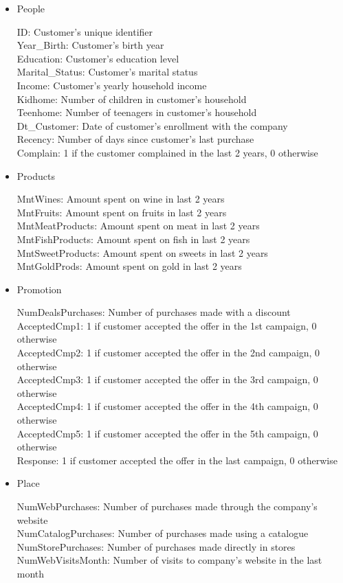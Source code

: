 \documentclass[11pt]{article}
\begin{document}
\begin{itemize}
\item People

ID: Customer's unique identifier\\
Year\_Birth: Customer's birth year\\
Education: Customer's education level\\
Marital\_Status: Customer's marital status\\
Income: Customer's yearly household income\\
Kidhome: Number of children in customer's household\\
Teenhome: Number of teenagers in customer's household\\
Dt\_Customer: Date of customer's enrollment with the company\\
Recency: Number of days since customer's last purchase\\
Complain: 1 if the customer complained in the last 2 years, 0 otherwise

\item Products

MntWines: Amount spent on wine in last 2 years\\
MntFruits: Amount spent on fruits in last 2 years\\
MntMeatProducts: Amount spent on meat in last 2 years\\
MntFishProducts: Amount spent on fish in last 2 years\\
MntSweetProducts: Amount spent on sweets in last 2 years\\
MntGoldProds: Amount spent on gold in last 2 years

\item Promotion

NumDealsPurchases: Number of purchases made with a discount\\
AcceptedCmp1: 1 if customer accepted the offer in the 1st campaign, 0 otherwise\\
AcceptedCmp2: 1 if customer accepted the offer in the 2nd campaign, 0 otherwise\\
AcceptedCmp3: 1 if customer accepted the offer in the 3rd campaign, 0 otherwise\\
AcceptedCmp4: 1 if customer accepted the offer in the 4th campaign, 0 otherwise\\
AcceptedCmp5: 1 if customer accepted the offer in the 5th campaign, 0 otherwise\\
Response: 1 if customer accepted the offer in the last campaign, 0 otherwise

\item Place

NumWebPurchases: Number of purchases made through the company’s website\\
NumCatalogPurchases: Number of purchases made using a catalogue\\
NumStorePurchases: Number of purchases made directly in stores\\
NumWebVisitsMonth: Number of visits to company’s website in the last month

\end{itemize}
\end{document}
